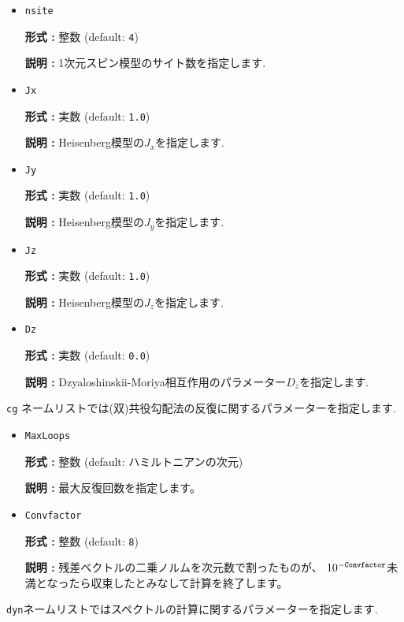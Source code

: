 \documentclass[12pt,titlepage]{jarticle}
\begin{document}
\begin{itemize}

\item  \verb|nsite|
  
  {\bf 形式 :} 整数 (default: \verb|4|)

  {\bf 説明 :} 1次元スピン模型のサイト数を指定します.
  
\item  \verb|Jx|
  
  {\bf 形式 :} 実数 (default: \verb|1.0|)

  {\bf 説明 :} Heisenberg模型の$J_x$を指定します.

\item  \verb|Jy|
  
  {\bf 形式 :} 実数 (default: \verb|1.0|)

  {\bf 説明 :} Heisenberg模型の$J_y$を指定します.

\item  \verb|Jz|
  
  {\bf 形式 :} 実数 (default: \verb|1.0|)

  {\bf 説明 :} Heisenberg模型の$J_z$を指定します.

\item  \verb|Dz|
  
  {\bf 形式 :} 実数 (default: \verb|0.0|)

  {\bf 説明 :} Dzyaloshinskii-Moriya相互作用のパラメーター$D_z$を指定します.

\end{itemize}

\verb|cg| ネームリストでは(双)共役勾配法の反復に関するパラメーターを指定します.

\begin{itemize}
\item  \verb|MaxLoops|
  
  {\bf 形式 :} 整数 (default: ハミルトニアンの次元)

  {\bf 説明 :} 最大反復回数を指定します。
  
\item  \verb|Convfactor|
  
  {\bf 形式 :} 整数 (default: \verb|8|)

  {\bf 説明 :} 残差ベクトルの二乗ノルムを次元数で割ったものが、
  $10^{-{\tt Convfactor}}$未満となったら収束したとみなして計算を終了します。
  
\end{itemize}

\verb|dyn|ネームリストではスペクトルの計算に関するパラメーターを指定します.
\end{document}
